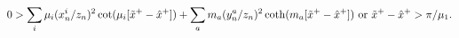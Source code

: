 \begin{equation}
\label{ineq5}
0 >
\sum_i \mu_i (x^i_n/z_n)^2 \cot(\mu_i  [\tilde x^+-\hat x^+]) + 
\sum_a m_a (y^a_n/z_n)^2 \coth(m_a  [\tilde x^+-\hat x^+])
\ {\rm or} \ \tilde x^+ - \hat x^+ > \pi/\mu_1.  
\end{equation}

